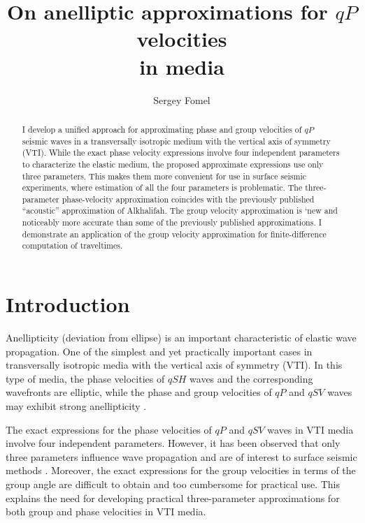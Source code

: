 \title{On anelliptic approximations for $qP$ velocities \\ in
 media}

\author{Sergey Fomel}

\maketitle

\begin{abstract}
I develop a unified approach for approximating phase and group
  velocities of $qP$ seismic waves in a transversally isotropic medium
  with the vertical axis of symmetry (VTI). While the exact phase
  velocity expressions involve four independent parameters to
  characterize the elastic medium, the proposed approximate
  expressions use only three parameters. This makes them more
  convenient for use in surface seismic experiments, where estimation
  of all the four parameters is problematic. The three-parameter
  phase-velocity approximation coincides with the previously published
  ``acoustic'' approximation of Alkhalifah. The group velocity
  approximation is `new and noticeably more accurate than some of the
  previously published approximations. I demonstrate an application of
  the group velocity approximation for finite-difference computation
  of traveltimes.
\end{abstract}

\section{Introduction}

Anellipticity (deviation from ellipse) is an important characteristic of
elastic wave propagation. One of the simplest and yet practically important
cases  in transversally isotropic media with
the vertical axis of symmetry (VTI). In this type of media, the phase
velocities of $qSH$ waves and the corresponding wavefronts are elliptic, while
the phase and group velocities of $qP$ and $qSV$ waves may exhibit strong
anellipticity \cite[]{tsvankin}.

The exact expressions for the phase velocities of $qP$ and $qSV$ waves in VTI
media involve four independent parameters. However, it has been observed that
only three parameters influence wave propagation 
and are of interest to surface seismic methods
\cite[]{GEO60-05-15501566}. Moreover, the exact expressions for the group
velocities in terms of the group angle are difficult to obtain and too
cumbersome for practical use. This explains the need for developing practical
three-parameter approximations for both group and phase velocities in VTI
media.

